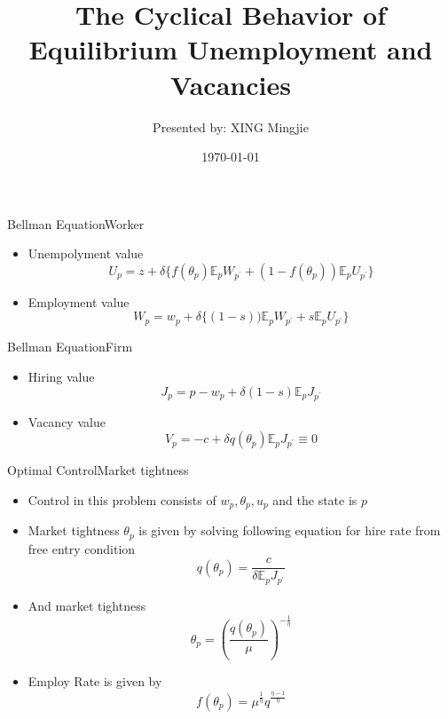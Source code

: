 \documentclass{beamer}
\title{The Cyclical Behavior of Equilibrium Unemployment and Vacancies\\
\citet{Shimer2005}}
\author{Presented by: XING Mingjie}
\date{\today}
\begin{document}
\begin{frame}
  \titlepage
\end{frame}

\begin{frame}{Bellman Equation}{Worker}
    \begin{itemize}
        \item Unempolyment value
            \begin{equation}\label{BellmanUnemploy}
                U_p = z + \delta \{f(\theta_p)\mathbb{E}_p W_{p^\prime} + (1-f(\theta_p))\mathbb{E}_p U_{p^\prime}\}
            \end{equation}
        \item Employment value
            \begin{equation}\label{BellmanEmploy}
                W_p = w_p + \delta \{(1-s))\mathbb{E}_p W_{p^\prime} + s\mathbb{E}_p U_{p^\prime}\}
            \end{equation}
    \end{itemize}
\end{frame}

\begin{frame}{Bellman Equation}{Firm}
    \begin{itemize}
        \item Hiring value
            \begin{equation}\label{BellmanHire}
                J_p = p - w_p + \delta (1-s)\mathbb{E}_p J_{p^\prime}
            \end{equation}
        \item Vacancy value
            \begin{equation}\label{BellmanVacancy}
                V_p = -c + \delta q(\theta_p)\mathbb{E}_p J_{p^\prime} \equiv 0
            \end{equation}
    \end{itemize}
\end{frame}

\begin{frame}{Optimal Control}{Market tightness}
    \begin{itemize}
        \item Control in this problem consists of \(w_p, \theta_p, u_p\) and the state is \(p\)
        \item Market tightness \(\theta_p\) is given by solving following equation for hire rate from free entry condition \begin{equation}\label{HireRate}
            q(\theta_p) = \frac{c}{\delta \mathbb{E}_p J_{p^\prime}}\end{equation}
        \item And market tightness \begin{equation}
            \label{MarketTightness}
            \theta_p = (\frac{q(\theta_p)}{\mu})^{-\frac{1}{\eta}}
            \end{equation}
        \item Employ Rate is given by \begin{equation}\label{EmployRate}
            f(\theta_p) = \mu^\frac{1}{\eta} q^\frac{\eta-1}{\eta}
        \end{equation}
    \end{itemize}
\end{frame}
\end{document}
